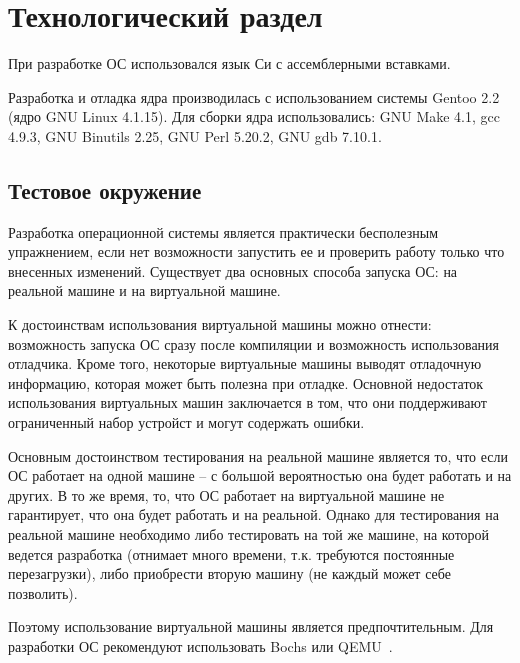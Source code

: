 \chapter{Технологический раздел}
\label{cha:impl}

При разработке ОС использовался язык Си с ассемблерными вставками.

Разработка и отладка ядра производилась с использованием системы Gentoo 2.2 (ядро
GNU Linux 4.1.15). Для сборки ядра использовались: GNU Make 4.1, gcc 4.9.3, GNU
Binutils 2.25, GNU Perl 5.20.2, GNU gdb 7.10.1.

\section{Тестовое окружение}
Разработка операционной системы является практически бесполезным упражнением,
если нет возможности запустить ее и проверить работу только что внесенных
изменений. Существует два основных способа запуска ОС: на реальной машине
и на виртуальной машине.

К достоинствам использования виртуальной машины можно отнести: возможность
запуска ОС сразу после компиляции и возможность использования отладчика. Кроме
того, некоторые виртуальные машины выводят отладочную информацию, которая
может быть полезна при отладке. Основной недостаток использования виртуальных
машин заключается в том, что они поддерживают ограниченный набор устройст и
могут содержать ошибки.

Основным достоинством тестирования на реальной машине является то, что если
ОС работает на одной машине -- с большой вероятностью она будет работать и
на других. В то же время, то, что ОС работает на виртуальной машине не
гарантирует, что она будет работать и на реальной. Однако для тестирования
на реальной машине необходимо либо тестировать на той же машине, на которой
ведется разработка (отнимает много времени, т.к. требуются постоянные
перезагрузки), либо приобрести вторую машину (не каждый может себе позволить).

Поэтому использование виртуальной машины является предпочтительным. Для
разработки ОС рекомендуют использовать Bochs или QEMU~\cite{os_dev}.

